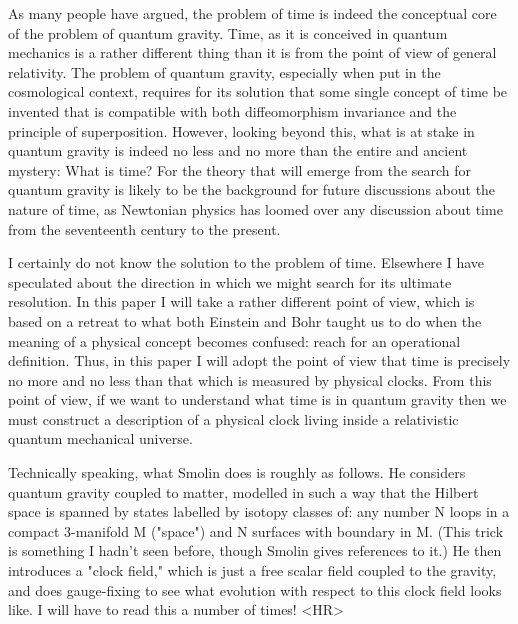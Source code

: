 As many people have argued, the problem of time is indeed the conceptual
core of the problem of quantum gravity.  Time, as it is conceived in
quantum mechanics is a rather different thing than it is from the
point of view of general relativity.  The problem of quantum gravity,
especially when put in the cosmological context, requires for
its solution that some single concept of time be invented that is
compatible with both diffeomorphism invariance and the principle
of superposition.  However, looking beyond this, what is at stake in
quantum gravity is indeed no less and no more than
the entire and ancient mystery: What is time?  For the theory that will 
emerge from the search for quantum gravity is likely to be the background 
for future discussions about the nature of time, as Newtonian physics
has loomed over any discussion about time from the seventeenth century
to the present.

I certainly do not know the solution to the problem of time.  Elsewhere I have
speculated about the direction in which we might search for its
ultimate resolution.  In this paper I will take a rather different
point of view, which is based on a retreat to what both Einstein and
Bohr taught us to do when the meaning of a physical concept becomes
confused: reach for an operational definition.  Thus, in
this paper I will adopt the point of view that time is precisely
no more and no less than that which is measured by physical clocks.  From
this point of view, if we want to understand what
time is in quantum gravity then we must construct a description of
a physical clock living inside a relativistic quantum mechanical
universe.

Technically speaking, what Smolin does is roughly as follows.  He
considers quantum gravity coupled to matter, modelled in such a way 
that the Hilbert space is spanned by states labelled by isotopy
classes of: any number N loops in a compact 3-manifold M ("space") and N 
surfaces with boundary in M.  (This trick is something I hadn't seen
before, though Smolin gives references to it.)   He then introduces
a "clock field," which is just a free scalar field coupled to the gravity,
and does gauge-fixing to see what evolution with respect to this
clock field looks like.   I will have to read this a number of times!
<HR>



